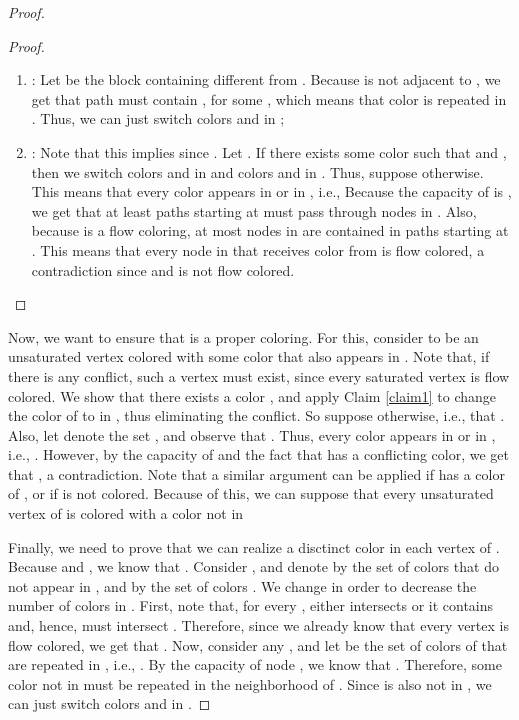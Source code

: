 \documentclass{llncs}
\begin{document}
\begin{proof}
\begin{proof}
\begin{enumerate}
  \item : Let  be the block containing  different from . Because  is not adjacent to , we get that path  must contain , for some , which means that color  is repeated in . Thus, we can just switch colors  and  in ;
	
  \item : Note that this implies  since . Let . If there exists some color  such that  and , then we switch colors  and  in  and colors  and  in . Thus, suppose otherwise. This means that every color appears in  or in , i.e., 
  Because the capacity of  is , we get that at least  paths starting at  must pass through nodes in  . Also, because  is a flow coloring, at most  nodes in  are contained in paths starting at . This means that every node in  that receives color from  is flow colored, a contradiction since  and  is not flow colored.
\end{enumerate}

\end{proof}

Now, we want to ensure that  is a proper coloring. For this, consider  to be an unsaturated vertex colored with some color that also appears in . Note that, if there is any conflict, such a vertex must exist, since every saturated vertex is flow colored. We show that  there exists a color , and apply Claim \ref{claim1} to change the color of  to  in , thus eliminating the conflict. So suppose otherwise, i.e., that . Also, let  denote the set , and observe that . Thus, every color appears in  or in , i.e., . However, by the capacity of  and the fact that  has a conflicting color, we get that , a contradiction. Note that a similar argument can be applied if  has a color of , or if  is not colored. Because of this, we can suppose that every unsaturated vertex of  is colored with a color not in 







Finally, we need to prove that we can realize a disctinct color in each vertex of . Because  and , we know that . Consider , and denote by  the set of colors that do not appear in , and by  the set of colors . We change  in order to decrease the number of colors in . First, note that, for every , either  intersects  or it contains  and, hence, must intersect . Therefore, since we already know that every vertex is flow colored, we get that . Now, consider any , and let  be the set of colors of  that are repeated in , i.e., . By the capacity of node , we know that . Therefore, some color  not in  must be repeated in the neighborhood of . Since  is also not in , we can just switch colors  and  in .


\end{proof}
\end{document}
